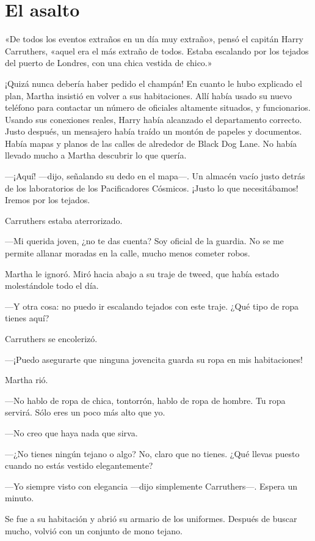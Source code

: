 \chapter*{El asalto}

«De todos los eventos extraños en un día muy extraño», pensó el capitán
Harry Carruthers, «aquel era el más extraño de todos. Estaba escalando
por los tejados del puerto de Londres, con una chica vestida de chico.»

¡Quizá nunca debería haber pedido el champán! En cuanto le hubo
explicado el plan, Martha insistió en volver a sus habitaciones. Allí
había usado su nuevo teléfono para contactar un número de oficiales
altamente situados, y funcionarios. Usando sus conexiones reales, Harry
había alcanzado el departamento correcto. Justo después, un mensajero
había traído un montón de papeles y documentos. Había mapas y planos de
las calles de alrededor de Black Dog Lane. No había llevado mucho a
Martha descubrir lo que quería.

---¡Aquí! ---dijo, señalando su dedo en el mapa---. Un almacén vacío
justo detrás de los laboratorios de los Pacificadores Cósmicos. ¡Justo
lo que necesitábamos! Iremos por los tejados.

Carruthers estaba aterrorizado.

---Mi querida joven, ¿no te das cuenta? Soy oficial de la guardia. No
se me permite allanar moradas en la calle, mucho menos cometer robos.

Martha le ignoró. Miró hacia abajo a su traje de tweed, que había estado
molestándole todo el día.

---Y otra cosa: no puedo ir escalando tejados con este traje. ¿Qué tipo
de ropa tienes aquí?

Carruthers se encolerizó.

---¡Puedo asegurarte que ninguna jovencita guarda su ropa en mis
habitaciones!

Martha rió.

---No hablo de ropa de chica, tontorrón, hablo de ropa de hombre. Tu
ropa servirá. Sólo eres un poco más alto que yo.

---No creo que haya nada que sirva.

---¿No tienes ningún tejano o algo? No, claro que no tienes. ¿Qué
llevas puesto cuando no estás vestido elegantemente?

---Yo siempre visto con elegancia ---dijo simplemente Carruthers---.
Espera un minuto.

Se fue a su habitación y abrió su armario de los uniformes. Después de
buscar mucho, volvió con un conjunto de mono tejano.

